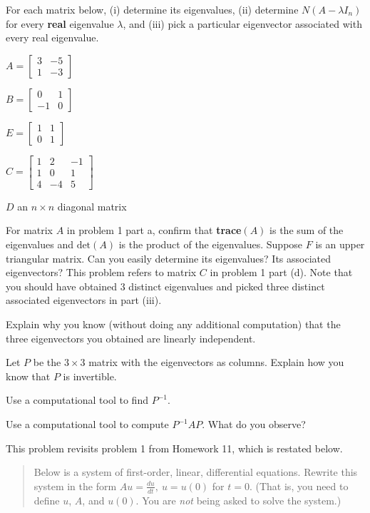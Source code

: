 \documentclass[minion]{homework}
\newcommand{\bbm}{\begin{bmatrix}}
\newcommand{\ebm}{\end{bmatrix}}
\begin{document}
\begin{problems}
\problem For each matrix below, (i) determine its eigenvalues, (ii) determine $N(A-\lambda I_n)$ for every \textbf{real} eigenvalue $\lambda$, and (iii) pick a particular eigenvector associated with every real eigenvalue.
	\begin{subproblems}
	\item $A=\bbm 3&-5\\1&-3\ebm$
	\item $B=\bbm 0&1\\ -1&0\ebm$
	\item $E=\bbm 1&1\\0&1 \ebm$
	\item $C=\bbm 1&2&-1\\1&0&1\\4&-4&5\ebm$
	\item $D$ an $n \times n$ diagonal matrix	
	\end{subproblems}
\problem For matrix $A$ in problem 1 part a, confirm that \textbf{trace}$(A)$ is the sum of the eigenvalues and $\text{det}(A)$ is the product of the eigenvalues.
\problem Suppose $F$ is an upper triangular matrix. Can you easily determine its eigenvalues? Its associated eigenvectors?
\problem This problem refers to matrix $C$ in problem 1 part (d). Note that you should have obtained 3 distinct eigenvalues and picked three distinct associated eigenvectors in part (iii).
	\begin{subproblems}
	\item Explain why you know (without doing any additional computation) that the three eigenvectors you obtained are linearly independent.
	\item Let $P$ be the $3 \times 3$ matrix with the eigenvectors as columns. Explain how you know that $P$ is invertible.
	\item Use a computational tool to find $P^{-1}$.
	\item Use a computational tool to compute $P^{-1}AP.$ What do you observe?
	 
	\end{subproblems}
\problem This problem revisits problem 1 from Homework 11, which is restated below.

\begin{quote}
Below is a system of first-order, linear, differential equations. Rewrite this system in the form $Au=\frac{du}{dt}, \: u=u(0)$ for $t=0.$ (That is, you need to define $u$, $A$, and $u(0).$ You are \emph{not} being asked to solve the system.)


\end{quote}
\end{problems}
\end{document}

